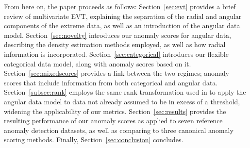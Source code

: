     
    
    
    




   

From here on, the paper proceeds as follows: Section~\ref{sec:evt} provides a brief review of 
    multivariate EVT, explaining the separation of the radial and angular components of the
    extreme data, as well as an introduction of the angular data model.  Section~\ref{sec:novelty} 
    introduces our anomaly scores for angular data, describing the density estimation methods 
    employed, as well as how radial information is incorporated.  Section~\ref{sec:categorical} 
    introduces our flexible categorical data model, along with anomaly scores based on it. 
    Section~\ref{sec:mixedscores} provides a link between the two regimes; anomaly scores that 
    include information from both categorical and angular data.  Section~\ref{subsec:rank} employs 
    the same rank transformation used in \cite{goix2017} to apply the angular data model to data 
    not already assumed to be in excess of a threshold, widening the applicability of our metrics.
    Section~\ref{sec:results} provides the resulting performance of our anomaly scores as applied 
    to seven reference anomaly detection datasets, as well as comparing to three canonical anomaly 
    scoring methods.  Finally, Section~\ref{sec:conclusion} concludes.

